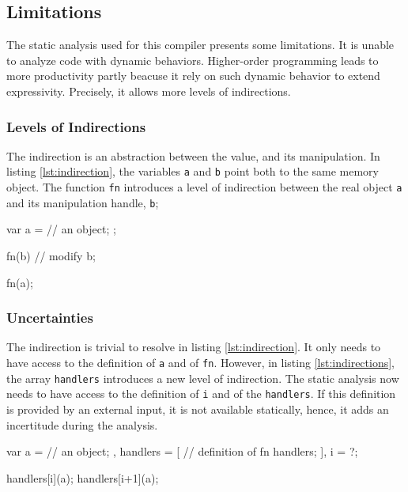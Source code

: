 \subsection{Limitations}

The static analysis used for this compiler presents some limitations.
It is unable to analyze code with dynamic behaviors.
Higher-order programming leads to more productivity partly beacuse it rely on such dynamic behavior to extend expressivity.
Precisely, it allows more levels of indirections.

\subsubsection{Levels of Indirections}

The indirection is an abstraction between the value, and its manipulation.
In listing \ref{lst:indirection}, the variables \texttt{a} and \texttt{b} point both to the same memory object.
The function \texttt{fn} introduces a level of indirection between the real object \texttt{a} and its manipulation handle, \texttt{b};

\begin{code}[js,
  caption={One level of Indirection},
  label={lst:indirection}]
var a = {
      // an object;
    };

fn(b) {
  // modify b;
}

fn(a);
\end{code}

\subsubsection{Uncertainties}

The indirection is trivial to resolve in listing \ref{lst:indirection}.
It only needs to have access to the definition of \texttt{a} and of \texttt{fn}.
However, in listing \ref{lst:indirections}, the array \texttt{handlers} introduces a new level of indirection.
The static analysis now needs to have access to the definition of \texttt{i} and of the \texttt{handlers}.
If this definition is provided by an external input, it is not available statically, hence, it adds an incertitude during the analysis. 

\begin{code}[js,
  caption={Two levels of indirection},
  label={lst:indirections}]
var a = {
      // an object;
    },
    handlers = [
      // definition of fn handlers;
    ],
    i = ?;

handlers[i](a);
handlers[i+1](a);
\end{code}

